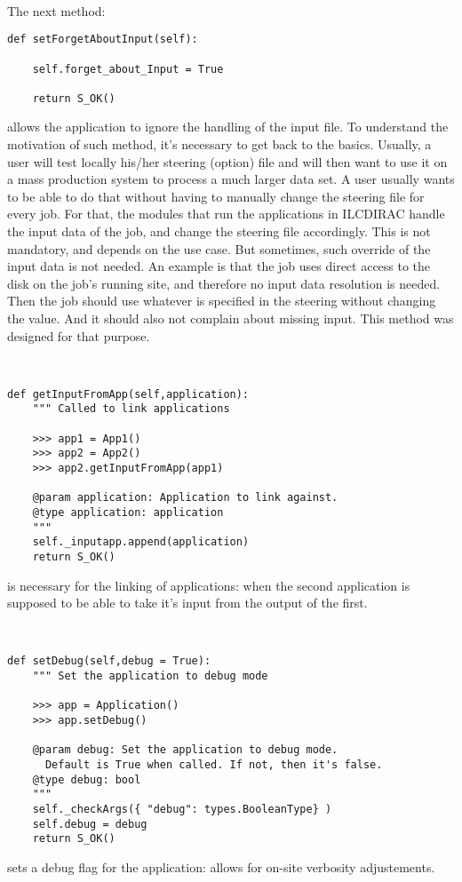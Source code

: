 \documentclass[a4paper,12pt]{article}
\begin{document}
~

The next method:
\begin{lstlisting}[firstnumber=240]  
  def setForgetAboutInput(self):
    
    self.forget_about_Input = True
    
    return S_OK()
\end{lstlisting}
allows the application to ignore the handling of the input file. To understand
the motivation of such method, it's necessary to get back to the basics.
Usually, a user will test locally his/her steering (option) file and will then
want to use it on a mass production system to process a much larger data set. A
user usually wants to be able to do that without having to manually change the
steering file for every job. For that, the modules that run the applications in
ILCDIRAC handle the input data of the job, and change the steering file
accordingly. This is not mandatory, and depends on the use case. But sometimes,
such override of the input data is not needed. An example is that the job uses
direct access to the disk on the job's running site, and therefore no input
data resolution is needed. Then the job should use whatever is specified in the
steering without changing the value. And it should also not complain about
missing input. This method was designed for that purpose.

~

\begin{lstlisting}[firstnumber=248]  
  def getInputFromApp(self,application):
    """ Called to link applications
    
    >>> app1 = App1()
    >>> app2 = App2()
    >>> app2.getInputFromApp(app1)
    
    @param application: Application to link against.
    @type application: application
    """
    self._inputapp.append(application)
    return S_OK()  
\end{lstlisting}
is necessary for the linking of applications: when the second application is
supposed to be able to take it's input from the output of the first.

~

\begin{lstlisting}[firstnumber=261]  
  def setDebug(self,debug = True):
    """ Set the application to debug mode
    
    >>> app = Application()
    >>> app.setDebug()
    
    @param debug: Set the application to debug mode. 
      Default is True when called. If not, then it's false.
    @type debug: bool
    """
    self._checkArgs({ "debug": types.BooleanType} )
    self.debug = debug
    return S_OK()
\end{lstlisting}
sets a debug flag for the application: allows for on-site verbosity
adjustements.
\end{document}
